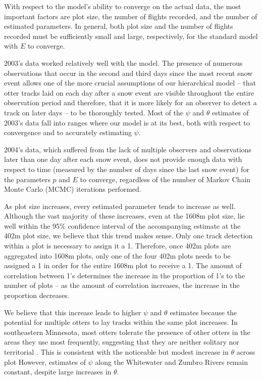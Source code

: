 \documentclass[12pt]{article}
\begin{document}
    With respect to the model's ability to converge on the actual data, the most
    important factors are plot size, the number of flights recorded, and the
    number of estimated parameters. In general, both plot size and the number of
    flights recorded must be sufficiently small and large, respectively, for the
    standard model with \(E\) to converge.

    2003's data worked relatively well with the model. The presence of numerous
    observations that occur in the second and third days since the most recent
    snow event allows one of the more crucial assumptions of our hierarchical
    model -- that otter tracks laid on each day after a snow event are visible
    throughout the entire observation period and therefore, that it is more
    likely for an observer to detect a track on later days -- to be thoroughly
    tested. Most of the \(\psi\) and \(\theta\) estimates of 2003's data fall
    into ranges where our model is at its best, both with respect to convergence
    and to accurately estimating \(\psi\).

    2004's data, which suffered from the lack of multiple observers and
    observations later than one day after each snow event, does not provide
    enough data with respect to time (measured by the number of days since the
    last snow event) for the parameters \(p\) and \(E\) to converge, regardless
    of the number of Markov Chain Monte Carlo (MCMC) iterations performed.

    As plot size increases, every estimated parameter tends to increase as well.
    Although the vast majority of these increases, even at the 1608m plot size,
    lie well within the 95\% confidence interval of the accompanying estimate at
    the 402m plot size, we believe that this trend makes sense. Only one track
    detection within a plot is necessary to assign it a 1. Therefore, once 402m
    plots are aggregated into 1608m plots, only one of the four 402m plots needs
    to be assigned a 1 in order for the entire 1608m plot to receive a 1. The
    amount of correlation between 1's determines the increase in the proportion
    of 1's to the number of plots -- as the amount of correlation increases, the
    increase in the proportion decreases.

    We believe that this increase leads to higher \(\psi\) and \(\theta\)
    estimates because the potential for multiple otters to lay tracks within the
    same plot increases. In southeastern Minnesota, most otters tolerate the
    presence of other otters in the areas they use most frequently, suggesting
    that they are neither solitary nor territorial \cite{Gorman2006}. This is
    consistent with the noticeable but modest increase in \(\theta\) across plot
    However, estimates of \(\psi\) along the Whitewater and Zumbro Rivers remain
    constant, despite large increases in \(\theta\).
\end{document}
